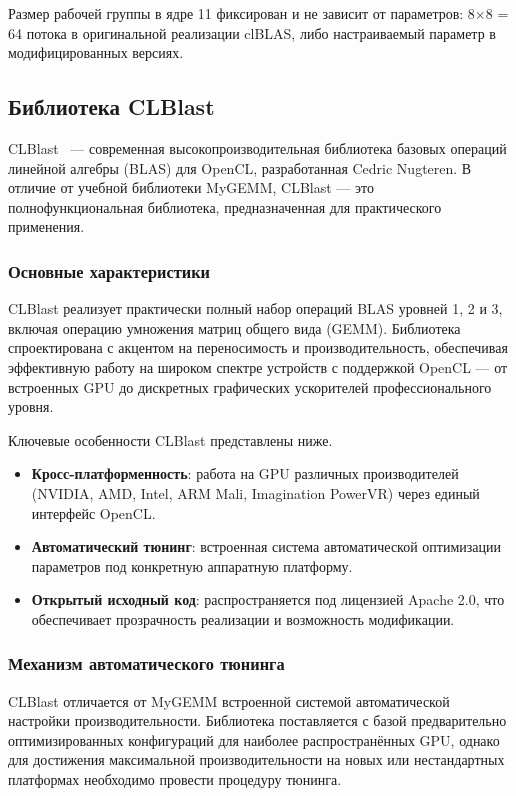 Размер рабочей группы в ядре 11 фиксирован и не зависит от параметров: 8×8 = 64 потока в оригинальной реализации clBLAS, либо настраиваемый параметр в модифицированных версиях.

\subsection{Библиотека CLBlast}

CLBlast~\cite{clblast} --- современная высокопроизводительная библиотека базовых операций линейной алгебры (BLAS) для OpenCL, разработанная Cedric Nugteren. В отличие от учебной библиотеки MyGEMM, CLBlast — это полнофункциональная библиотека, предназначенная для практического применения.

\subsubsection{Основные характеристики}

CLBlast реализует практически полный набор операций BLAS уровней 1, 2 и 3, включая операцию умножения матриц общего вида (GEMM). Библиотека спроектирована с акцентом на переносимость и производительность, обеспечивая эффективную работу на широком спектре устройств с поддержкой OpenCL --- от встроенных GPU до дискретных графических ускорителей профессионального уровня.

Ключевые особенности CLBlast представлены ниже.

\begin{itemize}
    \item \textbf{Кросс-платформенность}: работа на GPU различных производителей (NVIDIA, AMD, Intel, ARM Mali, Imagination PowerVR) через единый интерфейс OpenCL.
    \item \textbf{Автоматический тюнинг}: встроенная система автоматической оптимизации параметров под конкретную аппаратную платформу.
    \item \textbf{Открытый исходный код}: распространяется под лицензией Apache 2.0, что обеспечивает прозрачность реализации и возможность модификации.
\end{itemize}

\subsubsection{Механизм автоматического тюнинга}

CLBlast отличается от MyGEMM встроенной системой автоматической настройки производительности. Библиотека поставляется с базой предварительно оптимизированных конфигураций для наиболее распространённых GPU, однако для достижения максимальной производительности на новых или нестандартных платформах необходимо провести процедуру тюнинга.

